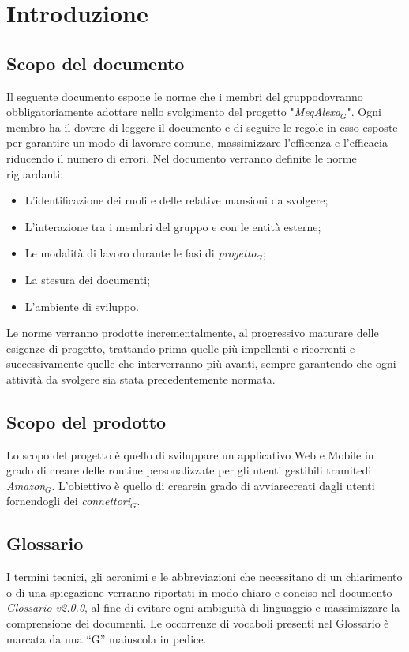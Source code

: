 \chapter{Introduzione}
\section{Scopo del documento}
Il seguente documento espone le norme che i membri del gruppodovranno obbligatoriamente adottare nello svolgimento del progetto "\textit{MegAlexa$_{G}$}".
Ogni membro ha il dovere di leggere il documento e di seguire le regole in esso esposte per garantire  un modo di lavorare comune, massimizzare l'efficenza e l'efficacia riducendo il numero di errori.
Nel documento verranno definite le  norme riguardanti:
\begin{itemize}
		\item L'identificazione dei ruoli e delle relative mansioni da svolgere;
		\item L'interazione tra i membri del gruppo e con le entità esterne;
		\item Le modalità di lavoro durante le fasi di \textit{progetto$_{G}$};
		\item La stesura dei documenti;
		\item L'ambiente di sviluppo.
\end{itemize}
Le norme verranno prodotte incrementalmente, al progressivo maturare delle esigenze di progetto, trattando prima quelle più impellenti e ricorrenti e successivamente quelle che interverranno più avanti, sempre garantendo che ogni attività da svolgere sia stata precedentemente normata.

\section{Scopo del prodotto}
Lo scopo del progetto è quello di sviluppare un applicativo Web e Mobile in grado di creare delle routine personalizzate per gli utenti gestibili tramitedi \textit{Amazon$_{G}$}. L'obiettivo è quello di crearein grado di avviarecreati dagli utenti fornendogli dei \textit{connettori$_{G}$}.

\section{Glossario}
I termini tecnici, gli acronimi e le abbreviazioni che necessitano di un chiarimento
o di una spiegazione verranno riportati in modo chiaro e conciso nel
documento \textit{Glossario v2.0.0}, al fine di evitare ogni ambiguità di linguaggio
e massimizzare la comprensione dei documenti. Le occorrenze di vocaboli presenti nel Glossario è marcata da una “G” maiuscola in pedice.

